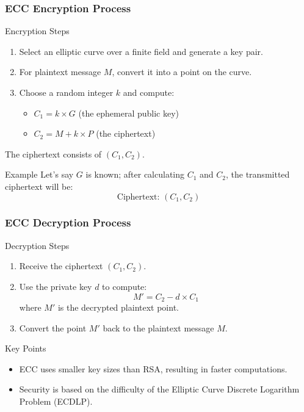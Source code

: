 \documentclass{beamer}
\begin{document}
\begin{frame}[fragile]
    \frametitle{ECC Encryption Process}
    \begin{block}{Encryption Steps}
        \begin{enumerate}
            \item Select an elliptic curve over a finite field and generate a key pair.
            \item For plaintext message $M$, convert it into a point on the curve.
            \item Choose a random integer $k$ and compute:
                \begin{itemize}
                    \item $C_1 = k \times G$ (the ephemeral public key)
                    \item $C_2 = M + k \times P$ (the ciphertext)
                \end{itemize}
        \end{enumerate}
        The ciphertext consists of $(C_1, C_2)$.
    \end{block}

    \begin{block}{Example}
        Let’s say $G$ is known; after calculating $C_1$ and $C_2$, the transmitted ciphertext will be:
        \[
        \text{Ciphertext: } (C_1, C_2)
        \]
    \end{block}
\end{frame}

\begin{frame}[fragile]
    \frametitle{ECC Decryption Process}
    \begin{block}{Decryption Steps}
        \begin{enumerate}
            \item Receive the ciphertext $(C_1, C_2)$.
            \item Use the private key $d$ to compute:
                \[
                M' = C_2 - d \times C_1
                \]
                where $M'$ is the decrypted plaintext point.
            \item Convert the point $M'$ back to the plaintext message $M$.
        \end{enumerate}
    \end{block}

    \begin{block}{Key Points}
        \begin{itemize}
            \item ECC uses smaller key sizes than RSA, resulting in faster computations.
            \item Security is based on the difficulty of the Elliptic Curve Discrete Logarithm Problem (ECDLP).
        \end{itemize}
    \end{block}
\end{frame}
\end{document}
